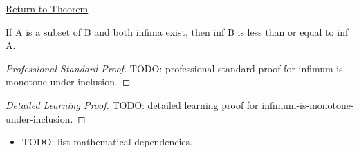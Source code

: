 \newpage
{}
\label{prf:infimum-is-monotone-under-inclusion}

\begin{remark*}[Return]
\hyperref[thm:infimum-is-monotone-under-inclusion]{Return to Theorem}
\end{remark*}

\begin{theorem*}
If A is a subset of B and both infima exist, then inf B is less than or equal to inf A.
\end{theorem*}

\begin{proof}[Professional Standard Proof]
\LRAProofBodyStart
TODO: professional standard proof for infimum-is-monotone-under-inclusion.
\end{proof}

\begin{proof}[Detailed Learning Proof]
\LRAProofBodyStart
TODO: detailed learning proof for infimum-is-monotone-under-inclusion.
\end{proof}

\begin{remark*}
\end{remark*}

\begin{dependencies}
\begin{itemize}
  \item TODO: list mathematical dependencies.
\end{itemize}
\end{dependencies}

\clearpage
